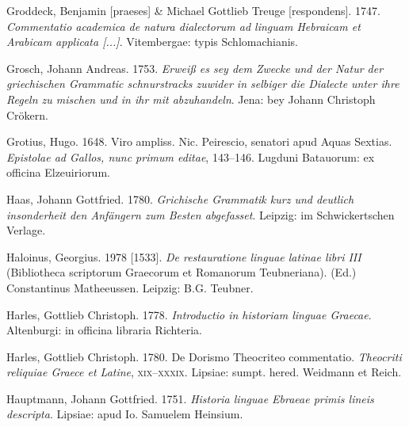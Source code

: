 \begin{styleStandard}
Groddeck, Benjamin [praeses] \& Michael Gottlieb Treuge [respondens]. 1747. \textit{Commentatio academica de natura dialectorum ad linguam Hebraicam et Arabicam applicata [...]}. Vitembergae: typis Schlomachianis.
\end{styleStandard}

\begin{styleStandard}
Grosch, Johann Andreas. 1753. \textit{Erweiß es sey dem Zwecke und der Natur der griechischen Grammatic schnurstracks zuwider in selbiger die Dialecte unter ihre Regeln zu mischen und in ihr mit abzuhandeln}. Jena: bey Johann Christoph Crökern.
\end{styleStandard}

\begin{styleStandard}
Grotius, Hugo. 1648. Viro ampliss. Nic. Peirescio, senatori apud Aquas Sextias. \textit{Epistolae ad Gallos, nunc primum editae}, 143–146. Lugduni Batauorum: ex officina Elzeuiriorum.
\end{styleStandard}

\begin{styleStandard}
Haas, Johann Gottfried. 1780. \textit{Grichische Grammatik kurz und deutlich insonderheit den Anfängern zum Besten abgefasset}. Leipzig: im Schwickertschen Verlage.
\end{styleStandard}

\begin{styleStandard}
Haloinus, Georgius. 1978 [1533]. \textit{De restauratione linguae latinae libri III} (Bibliotheca scriptorum Graecorum et Romanorum Teubneriana). (Ed.) Constantinus Matheeussen. Leipzig: B.G. Teubner.
\end{styleStandard}

\begin{styleStandard}
Harles, Gottlieb Christoph. 1778. \textit{Introductio in historiam linguae Graecae}. Altenburgi: in officina libraria Richteria.
\end{styleStandard}

\begin{styleStandard}
Harles, Gottlieb Christoph. 1780. De Dorismo Theocriteo commentatio. \textit{Theocriti reliquiae Graece et Latine}, \textsc{xix}–\textsc{xxxix}. Lipsiae: sumpt. hered. Weidmann et Reich.
\end{styleStandard}

\begin{styleStandard}
Hauptmann, Johann Gottfried. 1751. \textit{Historia linguae Ebraeae primis lineis descripta}. Lipsiae: apud Io. Samuelem Heinsium.
\end{styleStandard}

